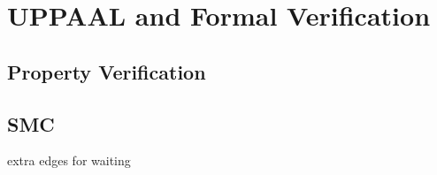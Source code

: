 \chapter{UPPAAL and Formal Verification}
\section{Property Verification}

\section{SMC}
extra edges for waiting